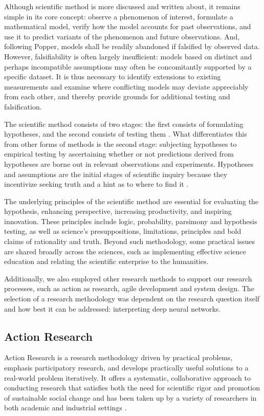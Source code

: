 Although scientific method \cite{2016397} is more discussed and written about, it remains simple in its core concept: observe a phenomenon of interest, formulate a mathematical model, verify how the model accounts for past observations, and use it to predict variants of the phenomenon and future observations. And, following Popper, models shall be readily abandoned if falsified by observed data. However, falsifiability is often largely insufficient: models based on distinct and perhaps incompatible assumptions may often be concomitantly supported by a specific dataset. It is thus necessary to identify extensions to existing measurements and examine where conflicting models may deviate appreciably from each other, and thereby provide grounds for additional testing and falsification.

The scientific method consists of two stages: the first consists of formulating hypotheses, and the second consists of testing them \cite{2016397}. What differentiates this from other forms of methods is the second stage: subjecting hypotheses to empirical testing by ascertaining whether or not predictions derived from hypotheses are borne out in relevant observations and experiments. Hypotheses and assumptions are the initial stages of scientific inquiry because they incentivize seeking truth and a hint as to where to find it \cite{AYALA2016xi}.

The underlying principles of the scientific method \cite{gauch_jr_2012} are essential for evaluating the hypothesis, enhancing perspective, increasing productivity, and inspiring innovation. These principles include logic, probability, parsimony and hypothesis testing, as well as science's presuppositions, limitations, principles and bold claims of rationality and truth. Beyond such methodology, some practical issues are shared broadly across the sciences, such as implementing effective science education and relating the scientific enterprise to the humanities.

Additionally, we also employed other research methods to support our research processes, such as action as research, agile development and system design. The selection of a research methodology was dependent on the research question itself and how best it can be addressed: interpreting deep neural networks.

\subsection{Action Research}
Action Research is a research methodology driven by practical problems, emphasis participatory research, and develops practically useful solutions to a real-world problem iteratively. It offers a systematic, collaborative approach to conducting research that satisfies both the need for scientific rigor and promotion of sustainable social change and has been taken up by a variety of researchers in both academic and industrial settings \cite{Hayes:2011:RAR:1993060.1993065}.

